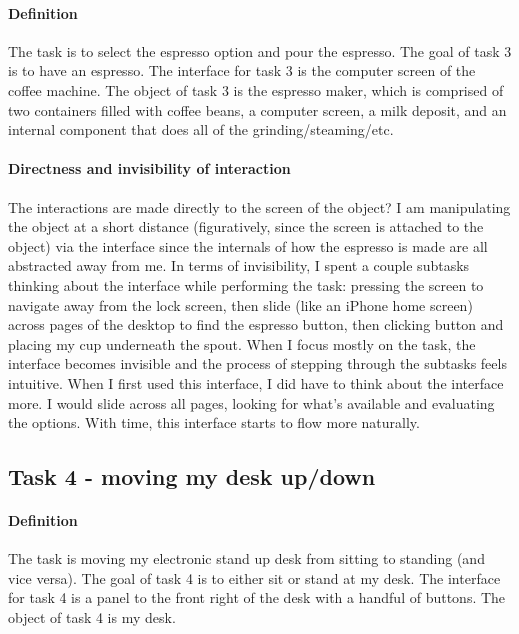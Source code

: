 \paragraph{Definition}
The task is to select the espresso option and pour the espresso. The goal of task 3 is to have an espresso. The interface for task 3 is the computer screen of the coffee machine. The object of task 3 is the espresso maker, which is comprised of two containers filled with coffee beans, a computer screen, a milk deposit, and an internal component that does all of the grinding/steaming/etc.

\paragraph{Directness and invisibility of interaction}
The interactions are made directly to the screen of the object? I am manipulating the object at a short distance (figuratively, since the screen is attached to the object) via the interface since the internals of how the espresso is made are all abstracted away from me. In terms of invisibility, I spent a couple subtasks thinking about the interface while performing the task: pressing the screen to navigate away from the lock screen, then slide (like an iPhone home screen) across pages of the desktop to find the espresso button, then clicking button and placing my cup underneath the spout. When I focus mostly on the task, the interface becomes invisible and the process of stepping through the subtasks feels intuitive. When I first used this interface, I did have to think about the interface more. I would slide across all pages, looking for what's available and evaluating the options. With time, this interface starts to flow more naturally.

\subsection{Task 4 - moving my desk up/down}

\paragraph{Definition}
The task is moving my electronic stand up desk from sitting to standing (and vice versa). The goal of task 4 is to either sit or stand at my desk. The interface for task 4 is a panel to the front right of the desk with a handful of buttons. The object of task 4 is my desk.

